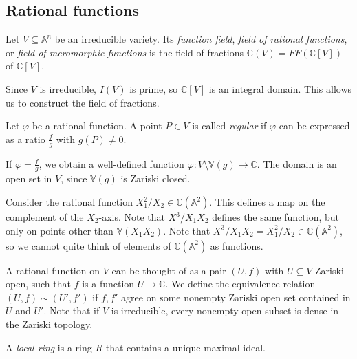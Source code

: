 \subsection{Rational functions}
\begin{definition}
    Let \( V \subseteq \mathbb A^n \) be an irreducible variety.
    Its \emph{function field}, \emph{field of rational functions}, or \emph{field of meromorphic functions} is the field of fractions \( \mathbb C(V) = FF(\mathbb C[V]) \) of \( \mathbb C[V] \).
\end{definition}
\begin{remark}
    Since \( V \) is irreducible, \( I(V) \) is prime, so \( \mathbb C[V] \) is an integral domain.
    This allows us to construct the field of fractions.
\end{remark}
\begin{definition}
    Let \( \varphi \) be a rational function.
    A point \( P \in V \) is called \emph{regular} if \( \varphi \) can be expressed as a ratio \( \frac{f}{g} \) with \( g(P) \neq 0 \).
\end{definition}
\begin{remark}
    If \( \varphi = \frac{f}{g} \), we obtain a well-defined function \( \varphi \colon V \setminus \mathbb V(g) \to \mathbb C \).
    The domain is an open set in \( V \), since \( \mathbb V(g) \) is Zariski closed.
\end{remark}
\begin{example}
    Consider the rational function \( X_1^2 / X_2 \in \mathbb C(\mathbb A^2) \).
    This defines a map on the complement of the \( X_2 \)-axis.
    Note that \( X^3 / X_1 X_2 \) defines the same function, but only on points other than \( \mathbb V(X_1 X_2) \).
    Note that \( X^3 / X_1 X_2 = X_1^2 / X_2 \in \mathbb C(\mathbb A^2) \), so we cannot quite think of elements of \( \mathbb C(\mathbb A^2) \) as functions.
\end{example}
\begin{remark}
    A rational function on \( V \) can be thought of as a pair \( (U, f) \) with \( U \subseteq V \) Zariski open, such that \( f \) is a function \( U \to \mathbb C \).
    We define the equivalence relation \( (U, f) \sim (U', f') \) if \( f, f' \) agree on some nonempty Zariski open set contained in \( U \) and \( U' \).
    Note that if \( V \) is irreducible, every nonempty open subset is dense in the Zariski topology.
\end{remark}
\begin{definition}
    A \emph{local ring} is a ring \( R \) that contains a unique maximal ideal.
\end{definition}
